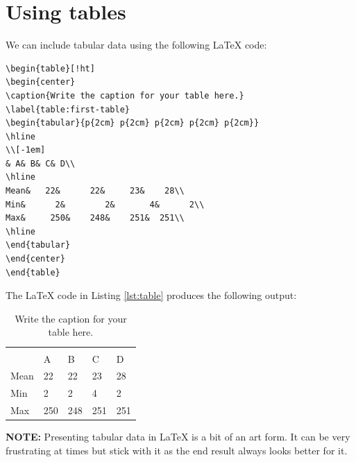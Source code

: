 \pagebreak

\section{Using tables}\label{sec:second-section}
We can include tabular data using the following \LaTeX{} code:
\begin{lstlisting}[caption={Formatting tabular data}, numbers=none, label={lst:table}]
\begin{table}[!ht]
\begin{center}
\caption{Write the caption for your table here.}
\label{table:first-table}
\begin{tabular}{p{2cm} p{2cm} p{2cm} p{2cm} p{2cm}}
\hline
\\[-1em]
& A& B& C& D\\
\hline
Mean&   22&      22&     23&    28\\
Min&      2&        2&       4&      2\\
Max&     250&    248&    251&  251\\
\hline
\end{tabular}
\end{center}
\end{table}
\end{lstlisting}

The \LaTeX{} code in Listing \ref{lst:table}  produces the following output:

\begin{table}[!ht]
	\begin{center}
		\caption{Write the caption for your table here.}
		\label{table:first-table}
		\begin{tabular}{p{2cm} p{2cm} p{2cm} p{2cm} p{2cm}}
			\hline
			\\[-1em]
			& A& B& C& D\\
			\hline
			Mean&   22&      22&     23&    28\\
			Min&      2&        2&       4&      2\\
			Max&     250&    248&    251&  251\\
			\hline
		\end{tabular}
	\end{center}
\end{table}

\textbf{NOTE:} Presenting tabular data in \LaTeX{} is a bit of an art form. It can be very frustrating at times but stick with it as the end result always looks better for it.

\pagebreak

